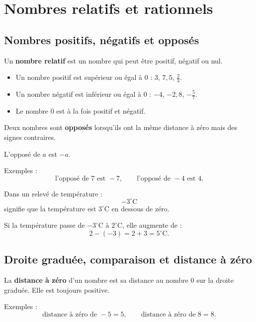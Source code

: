 \documentclass[11pt,a4paper]{article}
\begin{document}
\newpage

\section{Nombres relatifs et rationnels}

\subsection{Nombres positifs, négatifs et opposés}

\begin{definitionbox}
Un \textbf{nombre relatif} est un nombre qui peut être positif, négatif ou nul.

\begin{itemize}
  \item Un nombre positif est supérieur ou égal à $0$ : $3$, $7{,}5$, $\frac{2}{3}$.
  \item Un nombre négatif est inférieur ou égal à $0$ : $-4$, $-2{,}8$, $-\frac{5}{7}$.
  \item Le nombre $0$ est à la fois positif et négatif.
\end{itemize}
\end{definitionbox}

\begin{definitionbox}
Deux nombres sont \textbf{opposés} lorsqu'ils ont la même distance à zéro mais des signes contraires.

L'opposé de $a$ est $-a$.

Exemples :
\[
\text{l'opposé de } 7 \text{ est } -7,
\qquad
\text{l'opposé de } -4 \text{ est } 4.
\]
\end{definitionbox}

\begin{exemple}
Dans un relevé de température :
\[
-3^\circ\text{C}
\]
signifie que la température est $3^\circ$C en dessous de zéro.

Si la température passe de $-3^\circ$C à $2^\circ$C, elle augmente de :
\[
2-(-3)=2+3=5^\circ\text{C}.
\]
\end{exemple}

\subsection{Droite graduée, comparaison et distance à zéro}

\begin{definitionbox}
La \textbf{distance à zéro} d'un nombre est sa distance au nombre $0$ sur la droite graduée. Elle est toujours positive.

Exemples :
\[
\text{distance à zéro de } -5 = 5,
\qquad
\text{distance à zéro de } 8 = 8.
\]
\end{definitionbox}
\end{document}
